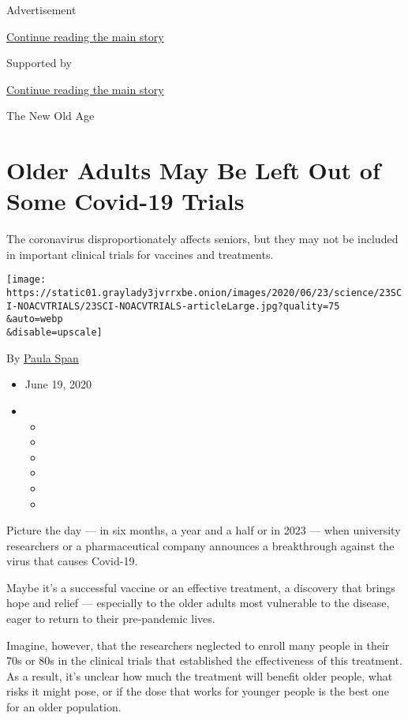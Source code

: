 Advertisement

\protect\hyperlink{after-top}{Continue reading the main story}

Supported by

\protect\hyperlink{after-sponsor}{Continue reading the main story}

The New Old Age

\hypertarget{older-adults-may-be-left-out-of-some-covid-19-trials}{%
\section{Older Adults May Be Left Out of Some Covid-19
Trials}\label{older-adults-may-be-left-out-of-some-covid-19-trials}}

The coronavirus disproportionately affects seniors, but they may not be
included in important clinical trials for vaccines and treatments.

\texttt{[image: https://static01.graylady3jvrrxbe.onion/images/2020/06/23/science/23SCI-NOACVTRIALS/23SCI-NOACVTRIALS-articleLarge.jpg?quality=75\\\&auto=webp\\\&disable=upscale]}

By \href{https://www.nytimes3xbfgragh.onion/by/paula-span}{Paula Span}

\begin{itemize}
\item
  June 19, 2020
\item
  \begin{itemize}
  \item
  \item
  \item
  \item
  \item
  \item
  \end{itemize}
\end{itemize}

Picture the day --- in six months, a year and a half or in 2023 --- when
university researchers or a pharmaceutical company announces a
breakthrough against the virus that causes Covid-19.

Maybe it's a successful vaccine or an effective treatment, a discovery
that brings hope and relief --- especially to the older adults most
vulnerable to the disease, eager to return to their pre-pandemic lives.

Imagine, however, that the researchers neglected to enroll many people
in their 70s or 80s in the clinical trials that established the
effectiveness of this treatment. As a result, it's unclear how much the
treatment will benefit older people, what risks it might pose, or if the
dose that works for younger people is the best one for an older
population.

